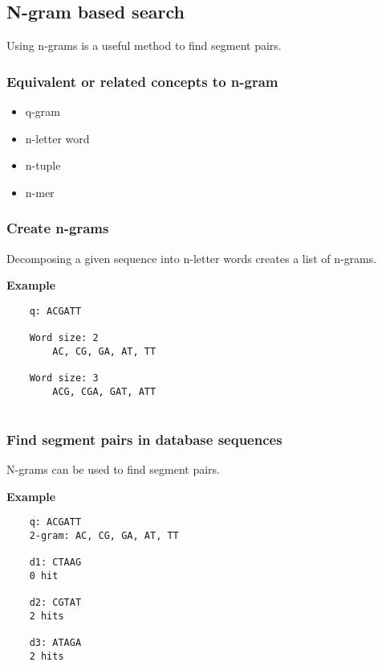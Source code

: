 %
% 

%
%
\subsection{N-gram based search}
Using n-grams is a useful method to find segment pairs.

%
%
\subsubsection*{Equivalent or related concepts to n-gram} 
\begin{itemize}
\item q-gram
\item n-letter word
\item n-tuple
\item n-mer
\end{itemize}

%
%
\subsubsection*{Create n-grams} 
Decomposing a given sequence into n-letter words creates a list of n-grams.

\medskip 

\noindent
\textbf{Example}

\begin{verbatim}
    q: ACGATT 
    
    Word size: 2
        AC, CG, GA, AT, TT
        
    Word size: 3    
        ACG, CGA, GAT, ATT
        
\end{verbatim}

%
%
\subsubsection*{Find segment pairs in database sequences} 
N-grams can be used to find segment pairs.

\medskip

\noindent
\textbf{Example}

\begin{verbatim}
    q: ACGATT 
    2-gram: AC, CG, GA, AT, TT
    
    d1: CTAAG
    0 hit

    d2: CGTAT
    2 hits

    d3: ATAGA
    2 hits
\end{verbatim}

\bigskip 

%
